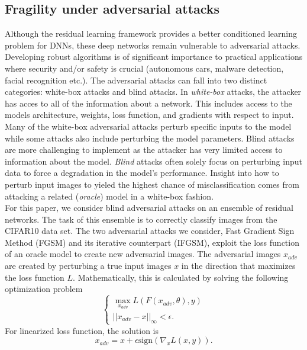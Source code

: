 \documentclass[12pt]{article}
\begin{document}
\subsection{Fragility under adversarial attacks}
Although the residual learning framework provides a better conditioned learning problem for DNNs, these deep networks remain vulnerable to adversarial attacks. Developing robust algorithms is of significant importance to practical applications where security and/or safety is crucial (autonomous cars, malware detection, facial recognition etc.). The adversarial attacks can fall into two distinct categories: white-box attacks and blind attacks. In \textit{white-box} attacks, the attacker has acces to all of the information about a network. This includes access to the models architecture, weights, loss function, and gradients with respect to input. Many of the white-box adversarial attacks perturb specific inputs to the model while some attacks also include perturbing the model parameters. Blind attacks are more challenging to implement as the attacker has very limited access to information about the model. \textit{Blind} attacks often solely focus on perturbing input data to force a degradation in the model's performance. Insight into how to perturb input images to yieled the highest chance of misclassification comes from attacking a related (\textit{oracle}) model in a white-box fashion.  \\
For this paper, we consider blind adversarial attacks on an ensemble of residual networks. The task of this ensemble is to correctly classify images from the CIFAR10 data set. The two adversarial attacks we consider, Fast Gradient Sign Method (FGSM) and its iterative counterpart (IFGSM), exploit the loss function of an oracle model to create new adversarial images. The adversarial images $x_{adv}$ are created by perturbing a true input images $x$ in the direction that maximizes the loss function $L$. Mathematically, this is calculated by solving the following optimization problem
\begin{equation}
  \begin{cases} \max\limits_{x_{adv}} L(F(x_{adv}, \theta),y) \\
   || x_{adv} - x ||_{\infty} < \epsilon.
  \end{cases}
  \label{eq:opt}
\end{equation}
For linearized loss function, the solution is
\begin{equation}
x_{adv} = x + \epsilon\text{sign}(\nabla_x L(x,y)).
  \label{eq:FGSM}
\end{equation}
\end{document}
